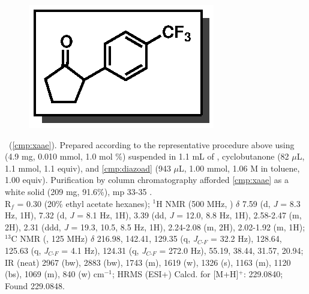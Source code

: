 \vspace{10pt}
\begin{figure}
  \vspace{-25pt}
  \begin{center}
    \includegraphics[scale=0.8]{chp_asymmetric/images/xaae}
  \end{center}
  \vspace{-30pt}
\end{figure}\noindent \textbf{\CMPxaae}\ (\ref{cmp:xaae}). Prepared
according to the representative procedure above using  (4.9 mg,
0.010 mmol, 1.0 mol \%) suspended in 1.1 mL of , cyclobutanone (82
$\mu$L, 1.1 mmol, 1.1 equiv), and \ref{cmp:diazoad} (943 $\mu$L, 1.00 mmol, 1.06
M in toluene, 1.00 equiv). Purification by column chromatography afforded
\ref{cmp:xaae} as a white solid (209 mg, 91.6\%), mp 33-35 \degc. \\
R$_f$ = 0.30
(20\% ethyl acetate hexanes); $^1$H NMR (500
MHz, ) $\delta$ 7.59 (d, \textit{J} = 8.3 Hz, 1H), 7.32 (d,
\textit{J} = 8.1 Hz, 1H), 3.39 (dd, \textit{J} = 12.0, 8.8 Hz, 1H), 2.58-2.47 (m, 2H),
2.31 (ddd, \textit{J} = 19.3, 10.5, 8.5 Hz, 1H), 2.24-2.08 (m, 2H), 2.02-1.92
(m, 1H); $^{13}$C NMR (, 125 MHz) $\delta$ 216.98, 142.41, 129.35 (q,
\textit{J}$_{C\mbox{-}F}$ = 32.2 Hz), 128.64, 125.63 (q,
\textit{J}$_{C\mbox{-}F}$ = 4.1 Hz), 124.31 (q, \textit{J}$_{C\mbox{-}F}$ =
272.0 Hz), 55.19, 38.44, 31.57, 20.94; IR (neat) 2967 (bw), 2883 (bw), 1743 (m),
1619 (w), 1326 (s), 1163 (m), 1120 (bs), 1069 (m), 840 (w) cm$^{-1}$; HRMS
(ESI+) Calcd. for  [M+H]$^+$: 229.0840; Found 229.0848.

